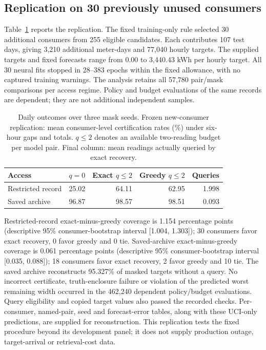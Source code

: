 \documentclass[12pt]{article}
\begin{document}
\subsection{Replication on 30 previously unused consumers}\label{app:replication-results}
\label{sec:newconsumers}
Table~\ref{tab:newconsumers} reports the replication. The fixed training-only rule selected 30 additional consumers from 255
eligible candidates. Each contributes 107 test days, giving 3,210
additional meter-days and 77,040 hourly targets.
The supplied targets and fixed forecasts range from 0.00 to
3,440.43 kWh per hourly target.
All 30 neural fits stopped in 28--383 epochs within the fixed allowance, with no captured training warnings. The analysis retains all 57,780
pair/mask comparisons per access regime. Policy and budget evaluations of
the same records are dependent; they are not additional independent samples.

\begin{table}[t]
\centering\small
\caption{Daily outcomes over three mask seeds. Frozen new-consumer replication: mean consumer-level certification
rates (\%) under six-hour gaps and totals. $q\leq2$ denotes an available
two-reading budget per model pair. Final column: mean readings actually
queried by exact recovery.}
\label{tab:newconsumers}
\begin{tabular}{lrrrr}
\toprule
Access & $q=0$ & Exact $q\leq2$ & Greedy $q\leq2$ & Queries\\
\midrule
Restricted record & 25.02 & 64.11 & 62.95 & 1.998\\
Saved archive & 96.87 & 98.57 & 98.51 & 0.093\\
\bottomrule
\end{tabular}
\end{table}

Restricted-record exact-minus-greedy coverage is 1.154 percentage points (descriptive 95\% consumer-bootstrap interval [1.004, 1.303]); 30 consumers favor exact recovery, 0 favor greedy and 0 tie.
Saved-archive exact-minus-greedy coverage is 0.061 percentage points (descriptive 95\% consumer-bootstrap interval [0.035, 0.088]); 18 consumers favor exact recovery, 2 favor greedy and 10 tie.
The saved archive reconstructs 95.327\% of masked targets without a query. No incorrect certificate,
truth-enclosure failure or violation of the predicted worst remaining
width occurred in the 462,240 dependent policy/budget
evaluations. Query eligibility and copied target values also passed the
recorded checks. Per-consumer, named-pair, seed and forecast-error tables,
along with these UCI-only predictions, are supplied for reconstruction.
This replication tests the fixed procedure beyond its development panel;
it does not supply production outage, target-arrival or retrieval-cost data.
\end{document}

